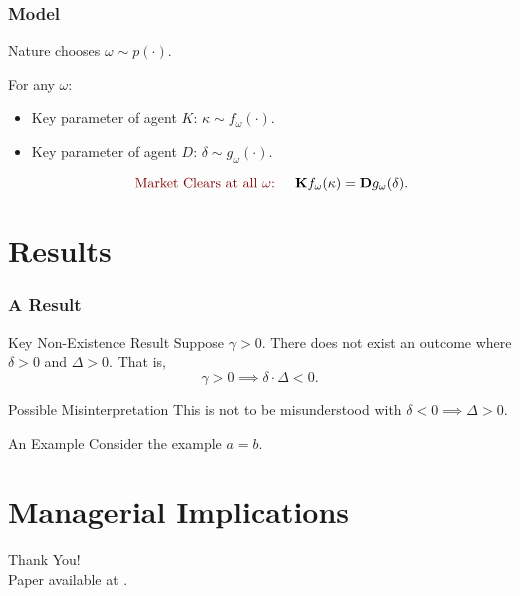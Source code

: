 \documentclass[10pt, mathserif, aspectratio = 169]{beamer}
\begin{document}
\begin{frame}
\frametitle{Model}

Nature chooses $\omega \sim p(\cdot)$.\pause\vspace{2em}

For any $\omega$:\pause\vspace{2em}

\begin{itemize}
\item Key parameter of agent $K$: $\kappa \sim  f_\omega(\cdot)$. \pause\vspace{2em}

\item Key parameter of agent $D$: $\delta \sim g_\omega(\cdot)$. \pause\vspace{2em}

\begin{equation*}
\text{\callout{Market Clears at all $\omega$:} } \quad \mathbf{K} f_\omega(\kappa) = \mathbf{D} g_\omega(\delta).
\end{equation*}
\end{itemize}


\end{frame}

\section{Results}

\begin{frame}
\frametitle{A Result}
\pause
\begin{block}{Key Non-Existence Result}
Suppose $\gamma > 0$. There does not exist an outcome where $\delta > 0$ and $\Delta > 0$. That is,
\begin{equation*}
\gamma > 0 \implies \delta \cdot \Delta < 0.
\end{equation*}
\end{block}

\pause

\begin{alertblock}{Possible Misinterpretation}
This is not to be misunderstood with $\delta < 0 \implies \Delta > 0$.
\end{alertblock}

\pause

\begin{exampleblock}{An Example}
Consider the example $a=b$.
\end{exampleblock}
\end{frame}

\section[Implications]{Managerial Implications}

\begin{frame}
\begin{center}
\textcolor{asumaroon}{\Large{Thank You!}}\\
Paper available at \texttt{}.
\end{center}



\end{frame}
\end{document}
